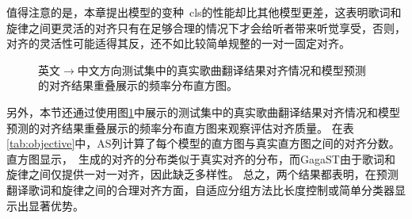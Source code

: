 值得注意的是，本章提出模型的变种\modelname~cls的性能却比其他模型更差，这表明歌词和旋律之间更灵活的对齐只有在足够合理的情况下才会给听者带来听觉享受，否则，对齐的灵活性可能适得其反，还不如比较简单规整的一对一固定对齐。
\begin{figure}[ht]
    \centering
\caption{英文$\rightarrow$中文方向测试集中的真实歌曲翻译结果对齐情况和模型预测的对齐结果重叠展示的频率分布直方图。}
\label{fig:align_hist1}
\end{figure}
另外，本节还通过使用图\ref{fig:align_hist1}中展示的测试集中的真实歌曲翻译结果对齐情况和模型预测的对齐结果重叠展示的频率分布直方图来观察评估对齐质量。
在表\ref{tab:objective}中，AS列计算了每个模型的直方图与真实直方图之间的对齐分数。
直方图显示，\modelname~生成的对齐的分布类似于真实对齐的分布，而GagaST由于歌词和旋律之间仅提供一对一对齐，因此缺乏多样性。
总之，两个结果都表明，在预测翻译歌词和旋律之间的合理对齐方面，自适应分组方法比长度控制或简单分类器显示出显著优势。
